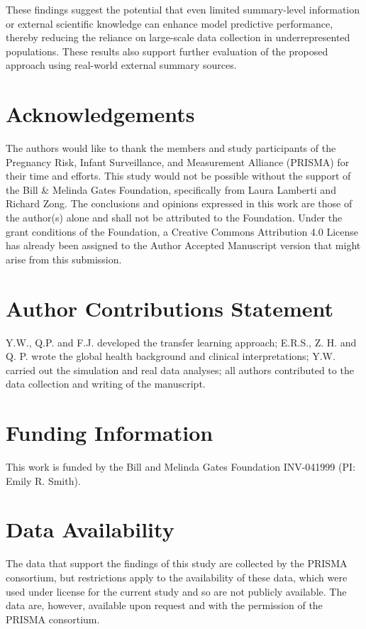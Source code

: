 \documentclass[fleqn,10pt]{wlscirep}
\begin{document}
These findings suggest the potential that even limited summary-level information or external scientific knowledge can enhance model predictive performance, thereby reducing the reliance on large-scale data collection in underrepresented populations. These results also support further evaluation of the proposed approach using real-world external summary sources.

\newpage


\section*{Acknowledgements}

The authors would like to thank the members and study participants of the Pregnancy Risk, Infant Surveillance, and Measurement Alliance (PRISMA) for their time and efforts. This study would not be possible without the support of the Bill \& Melinda Gates Foundation, specifically from Laura Lamberti and Richard Zong.  The conclusions and opinions expressed in this work are those of the author(s) alone and shall not be attributed to the Foundation. Under the grant conditions of the Foundation, a Creative Commons Attribution 4.0 License has already been assigned to the Author Accepted Manuscript version that might arise from this submission. 


\section*{Author Contributions Statement}
Y.W., Q.P. and F.J. developed the transfer learning approach; E.R.S., Z. H. and Q. P. wrote the global health background and clinical interpretations; Y.W. carried out the simulation and real data analyses; all authors contributed to the data collection and writing of the manuscript.

\section*{Funding Information}
This work is funded by the Bill and Melinda Gates Foundation INV-041999 (PI: Emily R. Smith).
\section*{Data Availability}
The data that support the findings of this study are collected by the PRISMA consortium, but restrictions apply to the availability of these data, which were used under license for the current study and so are not publicly available. The data are, however, available upon request and with the permission of the PRISMA consortium.
\end{document}
